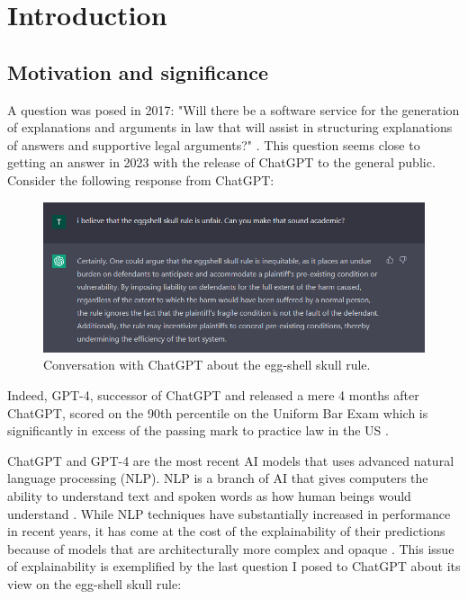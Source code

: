\chapter{Introduction} %

\label{chapter1} %

\section{Motivation and significance}
A question was posed in 2017: "Will there be a software service for the generation of explanations and arguments in law that will assist in structuring explanations of answers and supportive legal arguments?" \cite{ashley_2017}. This question seems close to getting an answer in 2023 with the release of ChatGPT \cite{openai} to the general public. Consider the following response from ChatGPT:  

\begin{figure}[!ht]
	\centering
	\includegraphics[width=1\linewidth]{figures/chatgpt3.png}
	\caption{Conversation with ChatGPT about the egg-shell skull rule.}   
  \label{fig:chatgpt}
\end{figure}

Indeed, GPT-4, successor of ChatGPT and released a mere 4 months after ChatGPT, scored on the 90th percentile on the Uniform Bar Exam which is significantly in excess of the passing mark to practice law in the US \cite{katz2023gpt}.

ChatGPT and GPT-4 are the most recent AI models that uses advanced natural language processing (NLP). NLP is a branch of AI that gives computers the ability to understand text and spoken words as how human beings would understand \cite{ibm_nlp}. While NLP techniques have substantially increased in performance in recent years, it has come at the cost of the explainability of their predictions because of models that are architecturally more complex and opaque \cite{zini2022}. This issue of explainability is exemplified by the last question I posed to ChatGPT about its view on the egg-shell skull rule:

